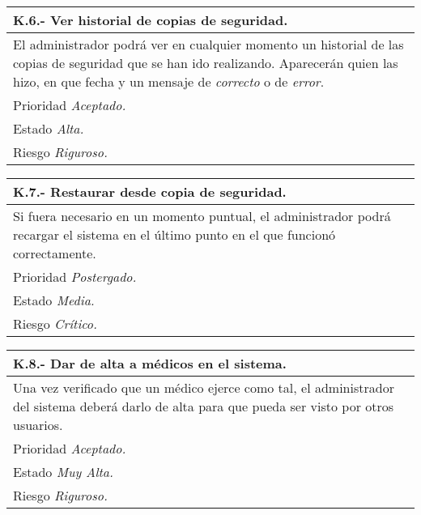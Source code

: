 	\begin{center}
	\begin{tabulary}{15cm}{|L|}
		\hline
			\bf{K.6.- Ver historial de copias de seguridad.} \\
		\hline
			El administrador podrá ver en cualquier momento un  historial de las copias de seguridad que se han ido realizando. Aparecerán quien las hizo, en que fecha y un mensaje de \textit{correcto} o de \textit{error}. \\
		\hline
			Prioridad \textit{Aceptado.} \\
		\hline
			Estado \textit{Alta.} \\
		\hline
			Riesgo \textit{Riguroso.} \\
		\hline
	\end{tabulary}
	\end{center}

	\begin{center}
	\begin{tabulary}{15cm}{|L|}
		\hline
			\bf{K.7.- Restaurar desde copia de seguridad.} \\
		\hline
			Si fuera necesario en un momento puntual, el administrador podrá recargar el sistema en el último punto en el que funcionó correctamente. \\
		\hline
			Prioridad \textit{Postergado.} \\
		\hline
			Estado \textit{Media.} \\
		\hline
			Riesgo \textit{Crítico.} \\
		\hline
	\end{tabulary}
	\end{center}

	\begin{center}
	\begin{tabulary}{15cm}{|L|}
		\hline
			\bf{K.8.- Dar de alta a médicos en el sistema.} \\
		\hline
			Una vez verificado que un médico ejerce como tal, el administrador del sistema deberá darlo de alta para que pueda ser visto por otros usuarios. \\
		\hline
			Prioridad \textit{Aceptado.} \\
		\hline
			Estado \textit{Muy Alta.} \\
		\hline
			Riesgo \textit{Riguroso.} \\
		\hline
	\end{tabulary}
	\end{center}

